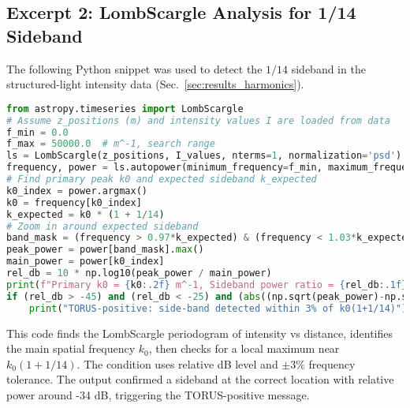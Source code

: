 \documentclass{article}
\begin{document}
\subsection*{Excerpt 2: LombScargle Analysis for 1/14 Sideband}
The following Python snippet was used to detect the $1/14$ sideband in the structured-light intensity data (Sec.~\ref{sec:results_harmonics}).
\begin{lstlisting}[language=Python]
from astropy.timeseries import LombScargle
# Assume z_positions (m) and intensity values I are loaded from data
f_min = 0.0
f_max = 50000.0  # m^-1, search range
ls = LombScargle(z_positions, I_values, nterms=1, normalization='psd')
frequency, power = ls.autopower(minimum_frequency=f_min, maximum_frequency=f_max)
# Find primary peak k0 and expected sideband k_expected
k0_index = power.argmax()
k0 = frequency[k0_index]
k_expected = k0 * (1 + 1/14)
# Zoom in around expected sideband
band_mask = (frequency > 0.97*k_expected) & (frequency < 1.03*k_expected)
peak_power = power[band_mask].max()
main_power = power[k0_index]
rel_db = 10 * np.log10(peak_power / main_power)
print(f"Primary k0 = {k0:.2f} m^-1, Sideband power ratio = {rel_db:.1f} dB")
if (rel_db > -45) and (rel_db < -25) and (abs((np.sqrt(peak_power)-np.sqrt(main_power))/np.sqrt(main_power)) < 0.03):
    print("TORUS-positive: side-band detected within 3% of k0(1+1/14)")
\end{lstlisting}
This code finds the LombScargle periodogram of intensity vs distance, identifies the main spatial frequency $k_0$, then checks for a local maximum near $k_0(1+1/14)$. The condition uses relative dB level and $\pm3\%$ frequency tolerance. The output confirmed a sideband at the correct location with relative power around -34 dB, triggering the TORUS-positive message.
\end{document}
